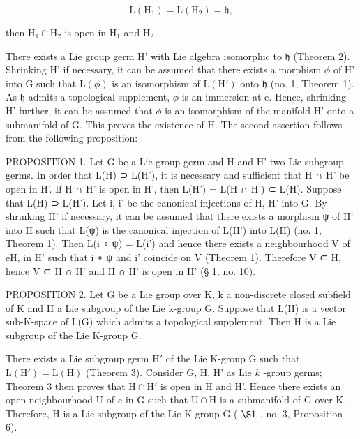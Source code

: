 \[
\mathrm{L} (\mathrm{H} _ {1}) = \mathrm{L} (\mathrm{H} _ {2}) = \mathfrak {h},
\]

then \(\mathrm{H}_1\cap \mathrm{H}_2\) is open in \(\mathrm{H}_1\) and \(\mathrm{H}_2\)

There exists a Lie group germ H' with Lie algebra isomorphic to \(\mathfrak{h}\) (Theorem 2). Shrinking H' if necessary, it can be assumed that there exists a morphism \(\phi\) of H' into G such that \(\mathrm{L}(\phi)\) is an isomorphism of \(\mathrm{L}(\mathrm{H}')\) onto \(\mathfrak{h}\) (no. 1, Theorem 1). As \(\mathfrak{h}\) admits a topological supplement, \(\phi\) is an immersion at e. Hence, shrinking H' further, it can be assumed that \(\phi\) is an isomorphism of the manifold H' onto a submanifold of G. This proves the existence of H. The second assertion follows from the following proposition:

PROPOSITION 1. Let G be a Lie group germ and H and H' two Lie subgroup germs. In order that L(H) ⊃ L(H'), it is necessary and sufficient that H ∩ H' be open in H'. If H ∩ H' is open in H', then L(H') = L(H ∩ H') ⊂ L(H). Suppose that L(H) ⊃ L(H'). Let i, i' be the canonical injections of H, H' into G. By shrinking H' if necessary, it can be assumed that there exists a morphism ψ of H' into H such that L(ψ) is the canonical injection of L(H') into L(H) (no. 1, Theorem 1). Then L(i ∘ ψ) = L(i') and hence there exists a neighbourhood V of eH, in H' such that i ∘ ψ and i' coincide on V (Theorem 1). Therefore V ⊂ H, hence V ⊂ H ∩ H' and H ∩ H' is open in H' (§ 1, no. 10).

PROPOSITION 2. Let G be a Lie group over K, k a non-discrete closed subfield of K and H a Lie subgroup of the Lie k-group G. Suppose that L(H) is a vector sub-K-space of L(G) which admits a topological supplement. Then H is a Lie subgroup of the Lie K-group G.

There exists a Lie subgroup germ \(\mathrm{H}'\) of the Lie K-group G such that \(\mathrm{L}(\mathrm{H}') = \mathrm{L}(\mathrm{H})\) (Theorem 3). Consider G, H, H' as Lie \(k\) -group germs; Theorem 3 then proves that \(\mathrm{H} \cap \mathrm{H}'\) is open in H and H'. Hence there exists an open neighbourhood U of \(e\) in G such that \(\mathrm{U} \cap \mathrm{H}\) is a submanifold of G over K. Therefore, H is a Lie subgroup of the Lie K-group G ( \(\S 1\) , no. 3, Proposition 6).


